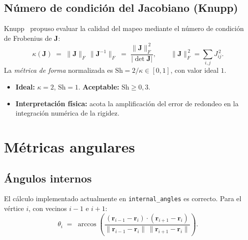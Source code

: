 \documentclass[11pt,a4paper]{article}
\begin{document}
\subsection{N\'umero de condici\'on del Jacobiano (Knupp)}

Knupp~\cite{Knupp2000} propuso evaluar la calidad del mapeo mediante el n\'umero de condici\'on de Frobenius de $\mathbf{J}$:
\begin{equation}
\kappa(\mathbf{J}) \;=\; \|\mathbf{J}\|_F\,\|\mathbf{J}^{-1}\|_F \;=\; \frac{\|\mathbf{J}\|_F^{\,2}}{|\det\mathbf{J}|}, \qquad \|\mathbf{J}\|_F^{\,2} = \sum_{i,j} J_{ij}^{\,2}.
\label{eq:kappa}
\end{equation}
La \emph{m\'etrica de forma} normalizada es $\mathrm{Sh} = 2/\kappa \in [0,1]$, con valor ideal $1$.
\begin{itemize}[leftmargin=1.2em]
  \item \textbf{Ideal:} $\kappa = 2$, $\mathrm{Sh}=1$. \textbf{Aceptable:} $\mathrm{Sh}\ge 0{,}3$.
  \item \textbf{Interpretaci\'on f\'isica:} acota la amplificaci\'on del error de redondeo en la integraci\'on num\'erica de la rigidez.
\end{itemize}

\section{M\'etricas angulares}
\label{sec:angles}

\subsection{\'Angulos internos}
El c\'alculo implementado actualmente en \texttt{internal\_angles} es correcto. Para el v\'ertice $i$, con vecinos $i-1$ e $i+1$:
\begin{equation}
\theta_i \;=\; \arccos\!\left(\frac{(\mathbf{r}_{i-1}-\mathbf{r}_i)\cdot(\mathbf{r}_{i+1}-\mathbf{r}_i)}{\|\mathbf{r}_{i-1}-\mathbf{r}_i\|\,\|\mathbf{r}_{i+1}-\mathbf{r}_i\|}\right).
\label{eq:theta_i}
\end{equation}
\end{document}

